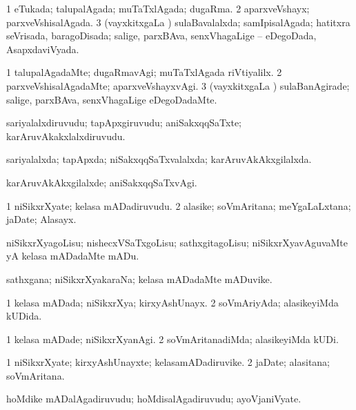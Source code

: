 \bentry
{}
\gl{\gu}
\bmng
\bnum
\num{1} eTukada; talupalAgada; muTaTxlAgada; dugaRma. 
\num{2} aparxveVshayx; parxveVshisalAgada. 
\num{3} (vayxkitxgaLa \vi) sulaBavalalxda; samIpisalAgada; hatitxra seVrisada, baragoDisada; salige, parxBAva, senxVhagaLige -- eDegoDada, AsapxdaviVyada. 
\enum
\emng
\eentry

\bentry
{}
\gl{\kirxvi}
\bmng
\bnum
\num{1} talupalAgadaMte; dugaRmavAgi; muTaTxlAgada riVtiyalilx. 
\num{2} parxveVshisalAgadaMte; aparxveVshayxvAgi. 
\num{3} (vayxkitxgaLa \vi) sulaBanAgirade; salige, parxBAva, senxVhagaLige eDegoDadaMte. 
\enum
\emng
\eentry

\bentry
{}
\gl{\nA}
\bmng
sariyalalxdiruvudu; tapApxgiruvudu; aniSakxqqSaTxte; karAruvAkakxlalxdiruvudu. 
\emng
\eentry

\bentry
{}
\gl{\gu}
\bmng
sariyalalxda; tapApxda; niSakxqqSaTxvalalxda; karAruvAkAkxgilalxda. 
\emng
\eentry

\bentry
{}
\gl{\kirxvi}
\bmng
karAruvAkAkxgilalxde; aniSakxqqSaTxvAgi. 
\emng
\eentry

\bentry
{}
\gl{\nA}
\bmng
\bnum
\num{1} niSikxrXyate; kelasa mADadiruvudu. 
\num{2} alasike; soVmAritana; meYgaLaLxtana; jaDate; Alasayx. 
\enum
\emng
\eentry

\bentry
{}
\gl{\sakirx}
\bmng
niSikxrXyagoLisu; nishecxVSaTxgoLisu; sathxgitagoLisu; niSikxrXyavAguvaMte yA kelasa mADadaMte mADu. 
\emng
\eentry

\bentry
{}
\gl{\nA}
\bmng
sathxgana; niSikxrXyakaraNa; kelasa mADadaMte mADuvike. 
\emng
\eentry

\bentry
{}
\gl{}
\bmng
\bnum
\num{1} kelasa mADada; niSikxrXya; kirxyAshUnayx. 
\num{2} soVmAriyAda; alasikeyiMda kUDida. 
\enum
\emng
\eentry

\bentry
{}
\gl{\kirxvi}
\bmng
\bnum
\num{1} kelasa mADade; niSikxrXyanAgi. 
\num{2} soVmAritanadiMda; alasikeyiMda kUDi. 
\enum
\emng
\eentry

\bentry
{}
\gl{\nA}
\bmng
\bnum
\num{1} niSikxrXyate; kirxyAshUnayxte; kelasamADadiruvike. 
\num{2} jaDate; alasitana; soVmAritana. 
\enum
\emng
\eentry

\bentry
{}
\gl{\nA}
\bmng
hoMdike mADalAgadiruvudu; hoMdisalAgadiruvudu; ayoVjaniVyate. 
\emng
\eentry

